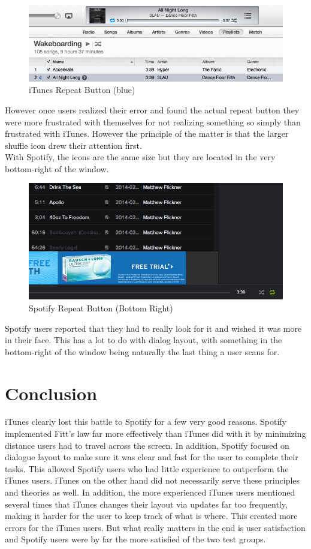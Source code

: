 \documentclass[a4paper]{article}
\begin{document}
\begin{figure}[H]
\centering
\includegraphics[width=.6\textwidth]{itunesrepeat.jpg}
\caption{\label{heuristic: iTunesRepeat} iTunes Repeat Button (blue)}
\end{figure}

However once users realized their error and found the actual repeat button they were more frustrated with themselves for not realizing something so simply than frustrated with iTunes. However the principle of the matter is that the larger shuffle icon drew their attention first.\\

With Spotify, the icons are the same size but they are located in the very bottom-right of the window.

\begin{figure}[H]
\centering
\includegraphics[width=.6\textwidth]{spotifyrepeat.jpg}
\caption{\label{heuristic: SpotifyRepeat} Spotify Repeat Button (Bottom Right)}
\end{figure}

Spotify users reported that they had to really look for it and wished it was more in their face. This has a lot to do with dialog layout, with something in the bottom-right of the window being naturally the last thing a user scans for.

\section{Conclusion}
iTunes clearly lost this battle to Spotify for a few very good reasons. Spotify implemented Fitt's law far more effectively than iTunes did with it by minimizing distance users had to travel across the screen. In addition, Spotify focused on dialogue layout to make sure it was clear and fast for the user to complete their tasks. This allowed Spotify users who had little experience to outperform the iTunes users. iTunes on the other hand did not necessarily serve these principles and theories as well. In addition, the more experienced iTunes users mentioned several times that iTunes changes their layout via updates far too frequently, making it harder for the user to keep track of what is where. This created more errors for the iTunes users. %
But what really matters in the end is user satisfaction and Spotify users were by far the more satisfied of the two test groups.
\end{document}
